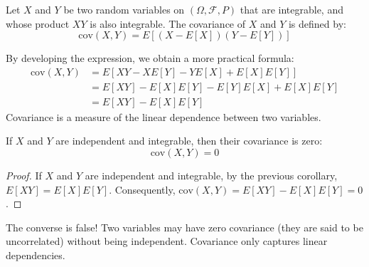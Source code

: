 \begin{definition}
Let $X$ and $Y$ be two random variables on $(\Omega, \mathcal{F}, P)$ that are integrable, and whose product $XY$ is also integrable.
The covariance of $X$ and $Y$ is defined by:
\[ \text{cov}(X,Y) = E[(X-E[X])(Y-E[Y])] \]
\end{definition}
By developing the expression, we obtain a more practical formula:%
\begin{align*}
\text{cov}(X,Y) &= E[XY - X E[Y] - Y E[X] + E[X]E[Y]] \\
&= E[XY] - E[X]E[Y] - E[Y]E[X] + E[X]E[Y] \\
&= E[XY] - E[X]E[Y]
\end{align*}%
Covariance is a measure of the linear dependence between two variables.%
\begin{proposition}
If $X$ and $Y$ are independent and integrable, then their covariance is zero:
\[ \text{cov}(X,Y) = 0 \]
\end{proposition}%
\begin{proof}
If $X$ and $Y$ are independent and integrable, by the previous corollary, $E[XY] = E[X]E[Y]$. Consequently, $\text{cov}(X,Y) = E[XY] - E[X]E[Y] = 0$.
\end{proof}%
\begin{remark}
The converse is false! Two variables may have zero covariance (they are said to be uncorrelated) without being independent. Covariance only captures linear dependencies.
\end{remark}
